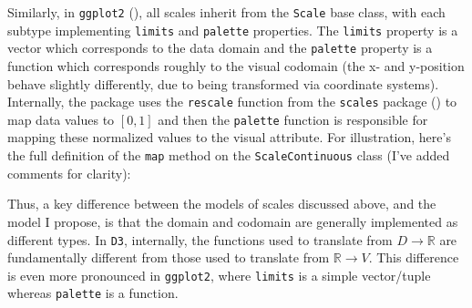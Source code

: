 \documentclass[
]{book}
\newenvironment{Shaded}{\begin{snugshade}}{\end{snugshade}}
\newcommand{\AttributeTok}[1]{\textcolor[rgb]{0.13,0.29,0.53}{#1}}
\newcommand{\CommentTok}[1]{\textcolor[rgb]{0.56,0.35,0.01}{\textit{#1}}}
\newcommand{\ControlFlowTok}[1]{\textcolor[rgb]{0.13,0.29,0.53}{\textbf{#1}}}
\newcommand{\FunctionTok}[1]{\textcolor[rgb]{0.13,0.29,0.53}{\textbf{#1}}}
\newcommand{\NormalTok}[1]{#1}
\newcommand{\OtherTok}[1]{\textcolor[rgb]{0.56,0.35,0.01}{#1}}
\newcommand{\SpecialCharTok}[1]{\textcolor[rgb]{0.81,0.36,0.00}{\textbf{#1}}}
\theoremstyle{definition}
\theoremstyle{definition}
\theoremstyle{definition}
\theoremstyle{definition}
\theoremstyle{remark}
\begin{document}
Similarly, in \texttt{ggplot2} (), all scales inherit from the \texttt{Scale} base class, with each subtype implementing \texttt{limits} and \texttt{palette} properties. The \texttt{limits} property is a vector which corresponds to the data domain and the \texttt{palette} property is a function which corresponds roughly to the visual codomain (the x- and y-position behave slightly differently, due to being transformed via coordinate systems). Internally, the package uses the \texttt{rescale} function from the \texttt{scales} package () to map data values to \([0, 1]\) and then the \texttt{palette} function is responsible for mapping these normalized values to the visual attribute. For illustration, here's the full definition of the \texttt{map} method on the \texttt{ScaleContinuous} class (I've added comments for clarity):

\begin{Shaded}
\end{Shaded}

Thus, a key difference between the models of scales discussed above, and the model I propose, is that the domain and codomain are generally implemented as different types. In \texttt{D3}, internally, the functions used to translate from \(D \to \mathbb{R}\) are fundamentally different from those used to translate from \(\mathbb{R} \to V\). This difference is even more pronounced in \texttt{ggplot2}, where \texttt{limits} is a simple vector/tuple whereas \texttt{palette} is a function.
\end{document}
